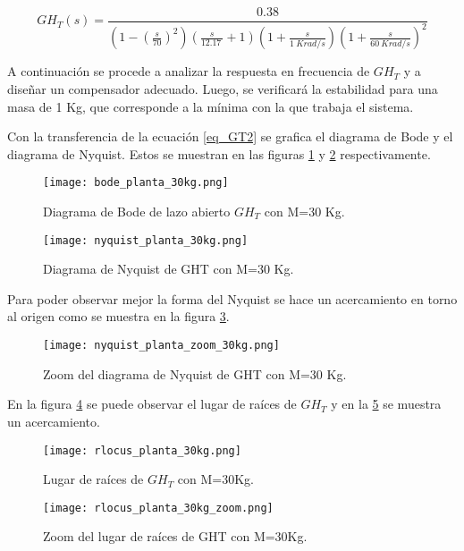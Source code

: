 \begin{equation} \label{eq_GT2}
		GH_T(s)=\frac{0.38}{(1-(\frac{s}{70})^2)(\frac{s}{12.17\ }+1)(1+\frac{s}{1\ Krad/s}){(1+\frac{s}{60\ Krad/s})}^2 }	
\end{equation}

\noindent A continuación se procede a analizar la respuesta en frecuencia de $GH_T$ y a diseñar un compensador adecuado. Luego, se verificará la estabilidad para una masa de 1 Kg, que corresponde a la mínima con la que trabaja el sistema.


\noindent Con la transferencia de la ecuación  \ref{eq_GT2} se  grafica el diagrama de Bode y el diagrama de Nyquist. Estos se muestran en las figuras \ref{fig:Diag_Bode_lazo_abierto_30kg} y \ref{fig:Diag_Nyquist_lazo_abierto_30kg} respectivamente.

\begin{figure}[H]
	\centering
	\texttt{[image: bode\_planta\_30kg.png]}
	\caption{Diagrama de Bode de lazo abierto $GH_T$ con M=30 Kg.}
	\label{fig:Diag_Bode_lazo_abierto_30kg}
\end{figure}

\begin{figure}[H]
	\centering
	\texttt{[image: nyquist\_planta\_30kg.png]}
	\caption{Diagrama de Nyquist de GHT con M=30 Kg.}
	\label{fig:Diag_Nyquist_lazo_abierto_30kg}
\end{figure}

\noindent Para poder observar mejor la forma del Nyquist se hace un acercamiento en torno al origen como se muestra en la figura \ref{fig:Diag_Nyquist_lazo_abierto_zoom_30kg}.

\begin{figure}[H]
	\centering
	\texttt{[image: nyquist\_planta\_zoom\_30kg.png]}
	\caption{Zoom del diagrama de Nyquist de GHT con M=30 Kg.}
	\label{fig:Diag_Nyquist_lazo_abierto_zoom_30kg}
\end{figure}

\noindent En la figura \ref{fig:rlocus_m30kg} se puede observar el lugar de raíces de $GH_{T}$ y en la \ref{fig:rlocus_m30kg_zoom} se muestra un acercamiento.

\begin{figure}[H]
	\centering
	\texttt{[image: rlocus\_planta\_30kg.png]}
	\caption{Lugar de raíces de $GH_{T}$ con M=30Kg.}
	\label{fig:rlocus_m30kg}
\end{figure}

\begin{figure}[H]
	\centering
	\texttt{[image: rlocus\_planta\_30kg\_zoom.png]}
	\caption{Zoom del lugar de raíces de GHT con M=30Kg.}
	\label{fig:rlocus_m30kg_zoom}
\end{figure}

